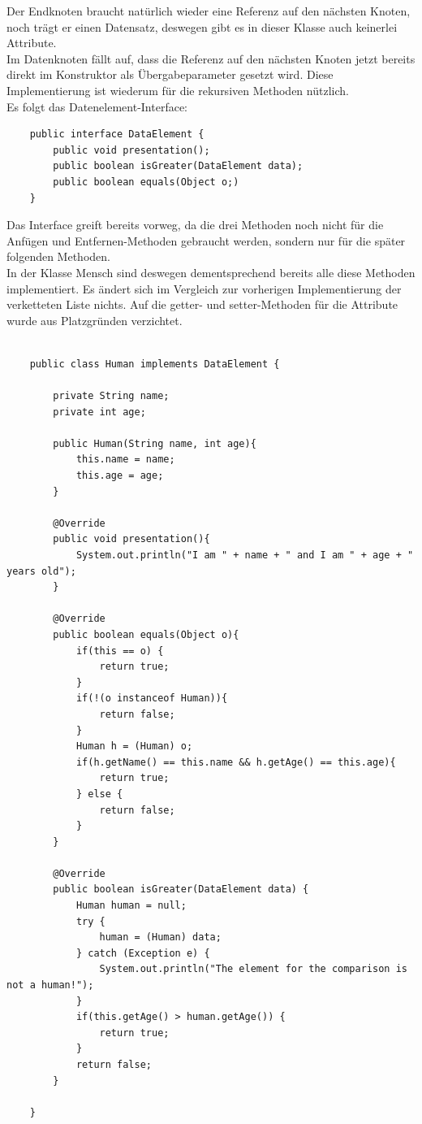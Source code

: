 \documentclass{article}
\begin{document}
Der Endknoten braucht natürlich wieder eine Referenz auf den nächsten Knoten, noch trägt er einen Datensatz, deswegen gibt es in dieser Klasse auch keinerlei Attribute. \\
Im Datenknoten fällt auf, dass die Referenz auf den nächsten Knoten jetzt bereits direkt im Konstruktor als Übergabeparameter gesetzt wird. Diese Implementierung ist wiederum für die rekursiven Methoden nützlich. \\
Es folgt das Datenelement-Interface:
\begin{verbatim}
    public interface DataElement {
        public void presentation();
        public boolean isGreater(DataElement data);
        public boolean equals(Object o;)
    }
\end{verbatim}
Das Interface greift bereits vorweg, da die drei Methoden noch nicht für die Anfügen und Entfernen-Methoden gebraucht werden, sondern nur für die später folgenden Methoden. \\
In der Klasse Mensch sind deswegen dementsprechend bereits alle diese Methoden implementiert. Es ändert sich im Vergleich zur vorherigen Implementierung der verketteten Liste nichts. Auf die getter- und setter-Methoden für die Attribute wurde aus Platzgründen verzichtet.
\begin{verbatim}

    public class Human implements DataElement {
    
        private String name;
        private int age; 
    
        public Human(String name, int age){
            this.name = name;
            this.age = age;
        }
    
        @Override
        public void presentation(){
            System.out.println("I am " + name + " and I am " + age + " years old");
        }

        @Override
        public boolean equals(Object o){
            if(this == o) {
                return true;
            }
            if(!(o instanceof Human)){
                return false;
            } 
            Human h = (Human) o;
            if(h.getName() == this.name && h.getAge() == this.age){
                return true;
            } else {
                return false;
            }
        }
    
        @Override
        public boolean isGreater(DataElement data) {
            Human human = null;
            try {
                human = (Human) data;
            } catch (Exception e) {
                System.out.println("The element for the comparison is not a human!");
            }
            if(this.getAge() > human.getAge()) {
                return true;
            }
            return false; 
        }
        
    }    
\end{verbatim}
\end{document}
